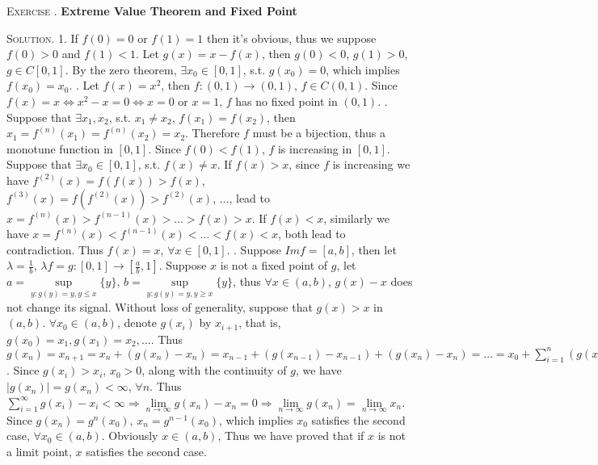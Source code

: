 \documentclass[12pt, a4paper, oneside]{ctexart}
\newcounter{problemname}
\newenvironment{exercise}{\stepcounter{problemname}\par\noindent\textsc{Exercise \arabic{problemname}. }}{\\\par}
\newenvironment{solution}{\par\noindent\textsc{Solution. }}{\\\par}
\begin{document}
\begin{exercise}
	\bf Extreme Value Theorem and Fixed Point
\end{exercise}

\begin{solution}
	1. If $f(0) = 0$ or $f(1) = 1$ then it's obvious, thus we suppose $f(0) > 0$ and $f(1) < 1$. Let $g(x) = x - f(x)$, then $g(0) < 0$, $g(1) > 0$, $g \in C[0,1]$. By the zero theorem,  $\exists x_{0} \in [0,1]$, s.t. $g(x_{0}) = 0$, which implies $f(x_{0}) = x_{0}$. . Let $f(x) = x^{2}$, then $f: (0,1)\to (0,1)$, $f \in C(0,1)$. Since $f(x) = x \Leftrightarrow x^{2} - x = 0 \Leftrightarrow x = 0$ or $x = 1$, $f$ has no fixed point in $(0,1)$. . Suppose that $\exists x_{1}, x_{2}$, s.t. $x_{1} \neq x_{2}$, $f(x_{1}) = f(x_{2})$, then $x_{1} = f^{(n)}(x_{1}) = f^{(n)}(x_{2}) = x_{2}$. Therefore $f$ must be a bijection, thus a monotune function in $[0,1]$. Since $f(0) < f(1)$, $f$ is increasing in $[0,1]$. Suppose that $\exists x_{0} \in [0,1]$, s.t. $f(x) \neq x$. If $f(x)> x$, since $f$ is increasing we have $f^{(2)}(x) = f(f(x)) > f(x)$, $f^{(3)}(x) = f(f^{(2)}(x)) > f^{(2)}(x)$, $\dots$, lead to $x = f^{(n)}(x) > f^{(n-1)}(x) > \dots > f(x) > x$. If $f(x) < x$, similarly we have $x = f^{(n)}(x) < f^{(n-1)}(x) < \dots < f(x) < x$, both lead to contradiction. Thus $f(x) = x$, $\forall x \in [0,1]$. . Suppose $Im f = [a,b]$, then let $\lambda = \frac{1}{b}$, $\lambda f = g: [0,1] \to [\frac{a}{b}, 1]$. Suppose $x$ is not a fixed point of $g$, let $a = \sup\limits_{y:g(y) = y, y \leq x}\{y\}$, $b = \sup\limits_{y:g(y) = y, y \geq x}\{y\}$, thus $\forall x \in (a, b)$, $g(x) - x$ does not change its signal. Without loss of generality, suppose that $g(x) > x$ in $(a, b)$. $\forall x_{0} \in (a, b)$, denote $g(x_{i})$ by $x_{i + 1}$, that is, $g(x_{0}) = x_{1}, g(x_{1}) = x_{2}, \dots$. Thus $g(x_{n}) = x_{n + 1} = x_{n} + (g(x_{n}) - x_{n}) = x_{n - 1} + (g(x_{n - 1}) - x_{n - 1}) + (g(x_{n}) - x_{n}) = \dots = x_{0} + \sum_{i = 1}^{n}(g(x_{i}) - x_{i})$. Since $g(x_{i}) > x_{i}$, $x_{0} > 0$, along with the continuity of $g$, we have $|g(x_{n})| = g(x_{n}) < \infty$, $\forall n$. Thus $\sum_{i = 1}^{\infty}g(x_{i}) - x_{i} < \infty \Rightarrow \lim\limits_{n \to \infty} g(x_{n}) - x_{n} = 0 \Rightarrow \lim\limits_{n \to \infty} g(x_{n}) = \lim\limits_{n \to \infty} x_{n}$. Since $g(x_{n}) = g^{n}(x_{0})$, $x_{n} = g^{n - 1}(x_{0})$, which implies $x_{0}$ satisfies the second case, $\forall x_{0} \in (a, b)$. Obviously $x \in (a, b)$, Thus we have proved that if $x$ is not a limit point, $x$ satisfies the second case.
\end{solution}
\end{document}
